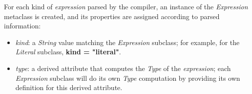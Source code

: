 For each kind of \emph{expression} parsed by the compiler,
an instance of the \emph{Expression} metaclass is created,
and its properties are assigned
according to parsed information:

\begin{itemize}
  \item \emph{kind}:
  a \emph{String} value matching the \emph{Expression} subclass;
  for example, for the \emph{Literal} subclass, \textbf{kind = "literal"}.
  \item \emph{type}:
  a derived attribute that computes the \emph{Type} of the \emph{expression};
  each \emph{Expression} subclass will do its own \emph{Type} computation
  by providing its own definition for this derived attribute.
\end{itemize}
